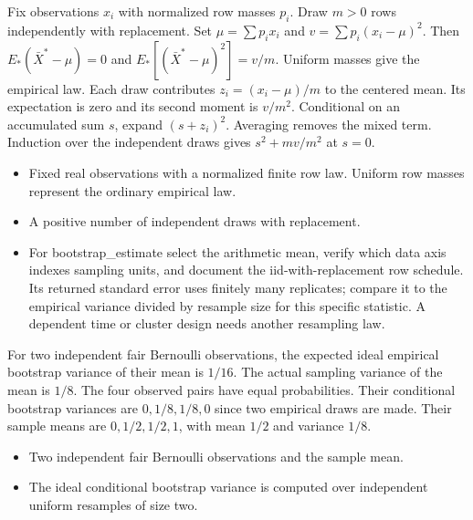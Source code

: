\expandafter\def\csname statadic@statement@STATADIC-BOOTSTRAP-001\endcsname{Fix observations $x_i$ with normalized row masses $p_i$.
  Draw $m>0$ rows independently with replacement. Set
  $\mu=\sum p_ix_i$ and $v=\sum p_i(x_i-\mu)^2$. Then
  $E_*(\bar X^*-\mu)=0$ and
  $E_*[(\bar X^*-\mu)^2]=v/m$. Uniform masses give the empirical law.}
\expandafter\def\csname statadic@proof@STATADIC-BOOTSTRAP-001\endcsname{Each draw contributes $z_i=(x_i-\mu)/m$ to the centered mean.
  Its expectation is zero and its second moment is $v/m^2$.
  Conditional on an accumulated sum $s$, expand $(s+z_i)^2$.
  Averaging removes the mixed term. Induction over the independent draws
  gives $s^2+m v/m^2$ at $s=0$.}
\expandafter\def\csname statadic@assumptions@STATADIC-BOOTSTRAP-001\endcsname{\begin{itemize}
\item Fixed real observations with a normalized finite row law. Uniform row masses represent the ordinary empirical law.
\item A positive number of independent draws with replacement.
\end{itemize}}
\expandafter\def\csname statadic@diagnostics@STATADIC-BOOTSTRAP-001\endcsname{\begin{itemize}
\item For bootstrap\_estimate select the arithmetic mean, verify which data axis indexes sampling units, and document the iid-with-replacement row schedule. Its returned standard error uses finitely many replicates; compare it to the empirical variance divided by resample size for this specific statistic. A dependent time or cluster design needs another resampling law.
\end{itemize}}
\expandafter\def\csname statadic@statement@STATADIC-BOOTSTRAP-002\endcsname{For two independent fair Bernoulli observations, the
  expected ideal empirical bootstrap variance of their mean is $1/16$.
  The actual sampling variance of the mean is $1/8$.}
\expandafter\def\csname statadic@proof@STATADIC-BOOTSTRAP-002\endcsname{The four observed pairs have equal probabilities. Their
  conditional bootstrap variances are $0,1/8,1/8,0$ since two empirical
  draws are made. Their sample means are $0,1/2,1/2,1$, with mean $1/2$
  and variance $1/8$.}
\expandafter\def\csname statadic@assumptions@STATADIC-BOOTSTRAP-002\endcsname{\begin{itemize}
\item Two independent fair Bernoulli observations and the sample mean.
\item The ideal conditional bootstrap variance is computed over independent uniform resamples of size two.
\end{itemize}}

